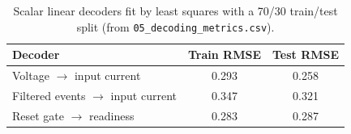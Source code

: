 \begin{table}[t]
\centering
\caption{Scalar linear decoders fit by least squares with a 70/30 train/test split (from \texttt{05\_decoding\_metrics.csv}).}
\label{tab:decoding}
\begin{tabular}{lcc}
\toprule
Decoder & Train RMSE & Test RMSE \\
\midrule
Voltage $\rightarrow$ input current & 0.293 & 0.258 \\
Filtered events $\rightarrow$ input current & 0.347 & 0.321 \\
Reset gate $\rightarrow$ readiness & 0.283 & 0.287 \\
\bottomrule
\end{tabular}
\end{table}
